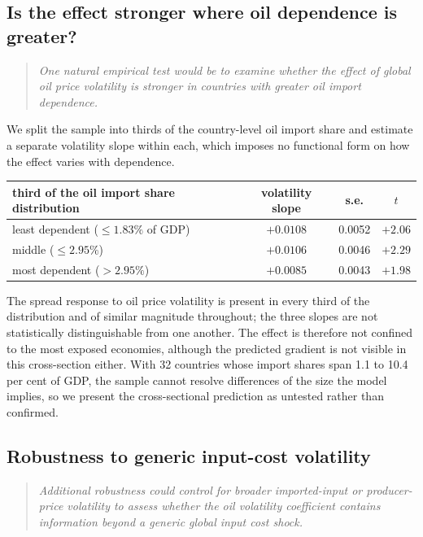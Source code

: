\subsection*{Is the effect stronger where oil dependence is greater?}

\begin{quote}\itshape
One natural empirical test would be to examine whether the effect of global oil
price volatility is stronger in countries with greater oil import dependence.
\end{quote}

We split the sample into thirds of the country-level oil import share and
estimate a separate volatility slope within each, which imposes no functional
form on how the effect varies with dependence.

\begin{table}[h]
\centering\footnotesize
\begin{tabular}{lccc}
\toprule
third of the oil import share distribution & volatility slope & s.e. & $t$ \\
\midrule
least dependent ($\leq 1.83\%$ of GDP) & $+0.0108$ & 0.0052 & $+2.06$ \\
middle ($\leq 2.95\%$)                 & $+0.0106$ & 0.0046 & $+2.29$ \\
most dependent ($> 2.95\%$)            & $+0.0085$ & 0.0043 & $+1.98$ \\
\bottomrule
\end{tabular}
\end{table}

The spread response to oil price volatility is present in every third of the
distribution and of similar magnitude throughout; the three slopes are not
statistically distinguishable from one another. The effect is therefore not
confined to the most exposed economies, although the predicted gradient is not
visible in this cross-section either. With 32 countries whose import shares span
1.1 to 10.4 per cent of GDP, the sample cannot resolve differences of the size
the model implies, so we present the cross-sectional prediction as untested
rather than confirmed.

\subsection*{Robustness to generic input-cost volatility}

\begin{quote}\itshape
Additional robustness could control for broader imported-input or producer-price
volatility to assess whether the oil volatility coefficient contains information
beyond a generic global input cost shock.
\end{quote}

